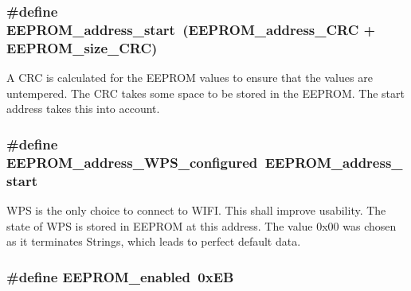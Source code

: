 \hypertarget{WIFIOnOff_8ino_a4e45a9ad8583fe2db7f42052e0a7ac95}{
\subsubsection[{E\-E\-P\-R\-O\-M\-\_\-address\-\_\-start}]{\setlength{\rightskip}{0pt plus 5cm}\#define E\-E\-P\-R\-O\-M\-\_\-address\-\_\-start~({\bf E\-E\-P\-R\-O\-M\-\_\-address\-\_\-\-C\-R\-C} + {\bf E\-E\-P\-R\-O\-M\-\_\-size\-\_\-\-C\-R\-C})}}\label{WIFIOnOff_8ino_a4e45a9ad8583fe2db7f42052e0a7ac95}


A C\-R\-C is calculated for the E\-E\-P\-R\-O\-M values to ensure that the values are untempered. The C\-R\-C takes some space to be stored in the E\-E\-P\-R\-O\-M. The start address takes this into account. 

\hypertarget{WIFIOnOff_8ino_ad4bdfcba39f823c70e99abea4dc16ffb}{
\subsubsection[{E\-E\-P\-R\-O\-M\-\_\-address\-\_\-\-W\-P\-S\-\_\-configured}]{\setlength{\rightskip}{0pt plus 5cm}\#define E\-E\-P\-R\-O\-M\-\_\-address\-\_\-\-W\-P\-S\-\_\-configured~{\bf E\-E\-P\-R\-O\-M\-\_\-address\-\_\-start}}}\label{WIFIOnOff_8ino_ad4bdfcba39f823c70e99abea4dc16ffb}


W\-P\-S is the only choice to connect to W\-I\-F\-I. This shall improve usability. The state of W\-P\-S is stored in E\-E\-P\-R\-O\-M at this address. The value 0x00 was chosen as it terminates Strings, which leads to perfect default data. 

\hypertarget{WIFIOnOff_8ino_a06c93cd8175c0a438c20922e313645bd}{
\subsubsection[{E\-E\-P\-R\-O\-M\-\_\-enabled}]{\setlength{\rightskip}{0pt plus 5cm}\#define E\-E\-P\-R\-O\-M\-\_\-enabled~0x\-E\-B}}\label{WIFIOnOff_8ino_a06c93cd8175c0a438c20922e313645bd}


